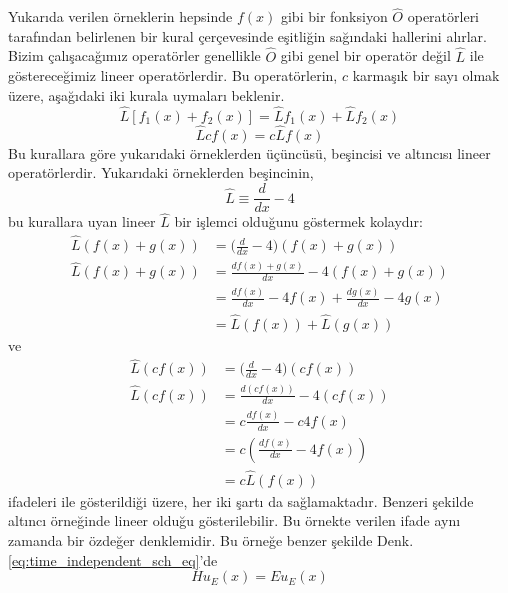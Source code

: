 \documentclass[a4paper,12pt, twoside]{article}
\begin{document}
Yukarıda verilen örneklerin hepsinde $f(x)$ gibi bir fonksiyon $\hat O$ operatörleri tarafından belirlenen bir kural çerçevesinde eşitliğin sağındaki hallerini alırlar. Bizim çalışacağımız operatörler genellikle $\hat O$ gibi genel bir operatör değil $\hat L$ ile göstereceğimiz lineer operatörlerdir. Bu operatörlerin, $c$ karmaşık bir sayı olmak üzere, aşağıdaki iki kurala uymaları beklenir.
\begin{equation}
\hat L \left[ f _ { 1 } ( x ) + f _ { 2 } ( x ) \right] = \hat  L f _ { 1 } ( x ) + \hat  L f _ { 2 } ( x )
\end{equation}
\begin{equation}
\hat L c f ( x ) = c \hat L f ( x )
\end{equation}
Bu kurallara göre yukarıdaki örneklerden üçüncüsü, beşincisi ve altıncısı  lineer operatörlerdir. Yukarıdaki örneklerden beşincinin,
\begin{equation*}
\hat  L \equiv \frac { d  } { d x } - 4 
\end{equation*}
bu kurallara uyan lineer $\hat L$ bir işlemci olduğunu göstermek kolaydır:
\begin{align*}
\hat  L (f ( x ) + g(x)) &= \bigg(\frac { d } { d x } - 4\bigg) (f ( x ) + g(x))\\
\hat  L (f ( x ) + g(x)) &= \frac { d f ( x ) + g(x)} { d x } - 4 (f ( x ) + g ( x ))\\
&= \frac { d f ( x ) } { d x } - 4 f ( x ) + \frac { d g ( x ) } { d x } - 4 g ( x ) \\
&= \hat  L (f ( x )) + \hat  L (g ( x ))
\end{align*}
ve
\begin{align*}
\hat  L (c f( x )) &= \bigg(\frac { d } { d x } - 4\bigg) (c f( x ))\\
\hat  L (c f ( x )) &= \frac { d (c f ( x ))} { d x } - 4 (c f ( x ))\\
&= c\frac { d f ( x ) } { d x } - c 4 f ( x ) \\
&= c(\frac { d f ( x ) } { d x } -  4 f ( x )) \\
&=  c \hat L (f ( x ))
\end{align*}
ifadeleri ile gösterildiği üzere, her iki şartı da sağlamaktadır. Benzeri şekilde altıncı örneğinde lineer olduğu gösterilebilir. Bu örnekte verilen ifade aynı zamanda bir özdeğer denklemidir. Bu örneğe benzer şekilde Denk. \ref{eq:time_independent_sch_eq}'de
\begin{equation}
H u_{E}(x)=E u_{E}(x)
\end{equation}
\end{document}
